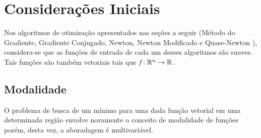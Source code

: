 \documentclass[a4paper,12pt,utf8x,notitlepage]{article}
\begin{document}
\setcounter{tocdepth}{3} 
\setcounter{secnumdepth}{3}

\begin{titlepage} 

\end{titlepage}

\fancyhead{}
\renewcommand{\footrulewidth}{0pt}
\renewcommand{\headrulewidth}{0.4pt}
\setcounter{page}{1}
\pagestyle{fancy}
\fancyfoot{}



\tableofcontents
\clearpage




\fancyhead{}
\setcounter{page}{1}
\renewcommand{\footrulewidth}{0pt}
\renewcommand{\headrulewidth}{0.4pt}
\fancyfoot[C]{\vfill \thepage}

\section{Considerações Iniciais}

\vspace{0.5cm}

Nos algoritmos de otimização apresentados nas seções a seguir (Método do Gradiente, Gradiente Conjugado, Newton, Newton Modificado e Quase-Newton ), considera-se que as funções de entrada de cada um desses algoritmos são suaves. Tais funções são também vetoriais tais que $\emph{f}:  \mathbb{R}^n \rightarrow  \mathbb{R}$.\\

\subsection{Modalidade}

\vspace{0.5cm}

O problema de busca de um mínimo para uma dada função vetorial em uma determinada região envolve novamente o conceito de modalidade de funções porém, desta vez, a aboradagem é multivariável. \\
\end{document}
